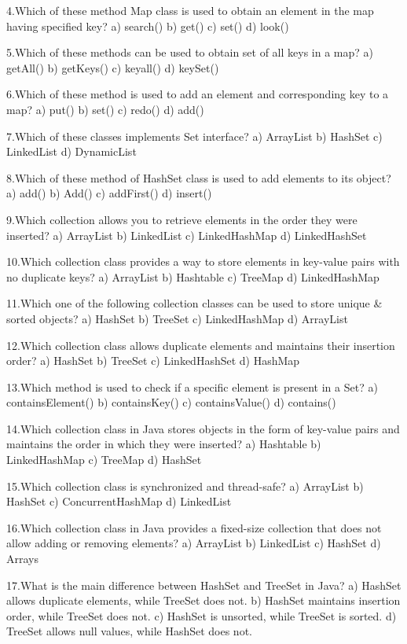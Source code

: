 {4.Which of these method Map class is used to obtain an element in the map having specified key?
a) search()
b) get()
c) set()
d) look()

5.Which of these methods can be used to obtain set of all keys in a map?
a) getAll()
b) getKeys()
c) keyall()
d) keySet()

6.Which of these method is used to add an element and corresponding key to a map?
a) put()
b) set()
c) redo()
d) add()

7.Which of these classes implements Set interface?
a) ArrayList
b) HashSet
c) LinkedList
d) DynamicList

8.Which of these method of HashSet class is used to add elements to its object?
a) add()
b) Add()
c) addFirst()
d) insert()

9.Which collection allows you to retrieve elements in the order they were inserted?
a) ArrayList
b) LinkedList
c) LinkedHashMap
d) LinkedHashSet

10.Which collection class provides a way to store elements in key-value pairs with no duplicate keys?
a) ArrayList
b) Hashtable
c) TreeMap
d) LinkedHashMap

11.Which one of the following collection classes can be used to store unique & sorted objects?
a) HashSet
b) TreeSet
c) LinkedHashMap
d) ArrayList

12.Which collection class allows duplicate elements and maintains their insertion order?
a) HashSet
b) TreeSet
c) LinkedHashSet
d) HashMap

13.Which method is used to check if a specific element is present in a Set?
a) containsElement()
b) containsKey()
c) containsValue()
d) contains()

14.Which collection class in Java stores objects in the form of key-value pairs and maintains the order in which they were inserted?
a) Hashtable
b) LinkedHashMap
c) TreeMap
d) HashSet

15.Which collection class is synchronized and thread-safe?
a) ArrayList
b) HashSet
c) ConcurrentHashMap
d) LinkedList

16.Which collection class in Java provides a fixed-size collection that does not allow adding or removing elements?
a) ArrayList
b) LinkedList
c) HashSet
d) Arrays

17.What is the main difference between HashSet and TreeSet in Java?
a) HashSet allows duplicate elements, while TreeSet does not.
b) HashSet maintains insertion order, while TreeSet does not.
c) HashSet is unsorted, while TreeSet is sorted.
d) TreeSet allows null values, while HashSet does not.

}
